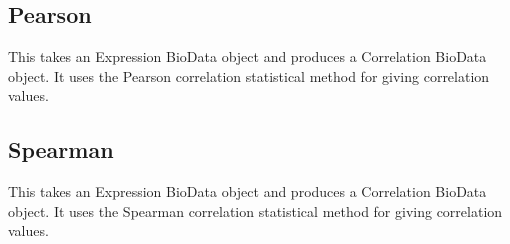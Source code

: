 \documentclass[10pt]{article}
\begin{document}
\subsection{Pearson}

This takes an Expression BioData object and produces a Correlation BioData 
object. It uses the Pearson correlation statistical method for giving 
correlation values.

\subsection{Spearman}

This takes an Expression BioData object and produces a Correlation BioData 
object. It uses the Spearman correlation statistical method for giving 
correlation values.
\end{document}
